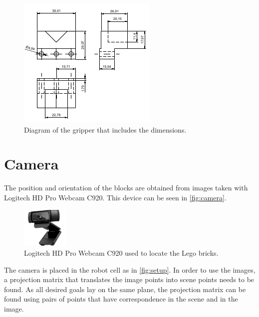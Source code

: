 \begin{figure}[H]
    \includegraphics[width=.4\textwidth]{figures/gripper}
    \caption{Diagram of the gripper that includes the dimensions.}
    \label{fig:gripper}  
\end{figure}


\section{Camera} \label{sec:camera}
The position and orientation of the blocks are obtained from images taken with Logitech HD Pro Webcam C920. This device can be seen in \autoref{fig:camera}.
\begin{figure}[H]
    \includegraphics[width=0.2\textwidth]{figures/camera.png}
    \caption{Logitech HD Pro Webcam C920 used to locate the Lego bricks.\cite{camera} }
    \label{fig:camera}
\end{figure}
The camera is placed in the robot cell as in \autoref{fig:setup}. In order to use the images, a projection matrix that translates the image points into scene points needs to be found. As all desired goals lay on the same plane, the projection matrix can be found using pairs of points that have correspondence in the scene and in the image.

